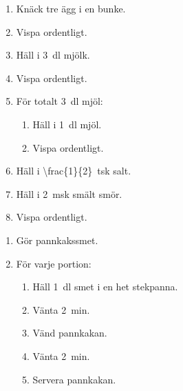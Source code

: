 \begin{frame}
  \begin{example}
    \begin{enumerate}
      \item Knäck tre ägg i en bunke.
      \item Vispa ordentligt.
      \item Häll i \SI{3}{\deci\litre} mjölk.
      \item Vispa ordentligt.
      \item För totalt \SI{3}{\deci\litre} mjöl:
        \begin{enumerate}
          \item Häll i \SI{1}{\deci\litre} mjöl.
          \item Vispa ordentligt.
        \end{enumerate}
      \item Häll i \SI{\frac{1}{2}}{tsk} salt.
      \item Häll i \SI{2}{msk} smält smör.
      \item Vispa ordentligt.
    \end{enumerate}
  \end{example}
\end{frame}

\begin{frame}
  \begin{example}
    \begin{enumerate}
      \item Gör pannkakssmet.
      \item För varje portion:
        \begin{enumerate}
          \item Häll \SI{1}{\deci\litre} smet i en het stekpanna.
          \item Vänta \SI{2}{\minute}.
          \item Vänd pannkakan.
          \item Vänta \SI{2}{\minute}.
          \item Servera pannkakan.
        \end{enumerate}
    \end{enumerate}
  \end{example}
\end{frame}


